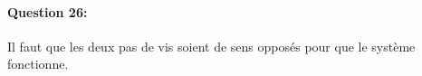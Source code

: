 \paragraph{Question 26:}

Il faut que les deux pas de vis soient de sens opposés pour que le système fonctionne.


